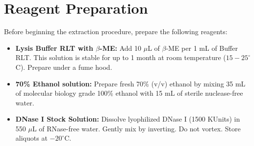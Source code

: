\section{Reagent Preparation}
Before beginning the extraction procedure, prepare the following reagents:
\begin{itemize}
  \item \textbf{Lysis Buffer RLT with $\beta$-ME:} Add 10 $\mu$L of $\beta$-ME per 1 mL of Buffer RLT. This solution is stable for up to 1 month at room temperature ($15{-}25^\circ$C). Prepare under a fume hood.
  \item \textbf{70\% Ethanol solution:} Prepare fresh 70\% (v/v) ethanol by mixing 35 mL of molecular biology grade 100\% ethanol with 15 mL of sterile nuclease-free water.
  \item \textbf{DNase I Stock Solution:} Dissolve lyophilized DNase I (1500 KUnits) in 550 $\mu$L of RNase-free water. Gently mix by inverting. Do not vortex. Store aliquots at $-20^\circ$C.
\end{itemize}
